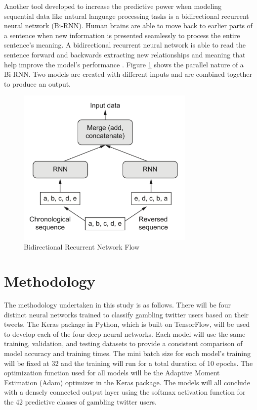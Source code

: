 \documentclass[5p,authoryear]{elsarticle}
\begin{document}
Another tool developed to increase the predictive power when modeling sequential data like natural language processing tasks is a bidirectional recurrent neural network (Bi-RNN). Human brains are able to move back to earlier parts of a sentence when new information is presented seamlessly to process the entire sentence’s meaning. A bidirectional recurrent neural network is able to read the sentence forward and backwards extracting new relationships and meaning that help improve the model’s performance \citep{lane}. Figure \ref{BiRNN_Flow} shows the parallel nature of a Bi-RNN. Two models are created with different inputs and are combined together to produce an output.


\begin{figure}[!h] 
    \centering
	\includegraphics[width=3.4in]{figures/Bi-RNN_Flow.png}
	\caption[]{Bidirectional Recurrent Network Flow} 
	\label{BiRNN_Flow} 
\end{figure}


\section{Methodology}\label{meth}

The methodology undertaken in this study is as follows. There will be four distinct neural networks trained to classify gambling twitter users based on their tweets. The Keras package in Python, which is built on TensorFlow, will be used to develop each of the four deep neural networks. Each model will use the same training, validation, and testing datasets to provide a consistent comparison of model accuracy and training times. The mini batch size for each model’s training will be fixed at 32 and the training will run for a total duration of 10 epochs. The optimization function used for all models will be the Adaptive Moment Estimation (Adam) optimizer in the Keras package. The models will all conclude with a densely connected output layer using the softmax activation function for the 42 predictive classes of gambling twitter users.
\end{document}
